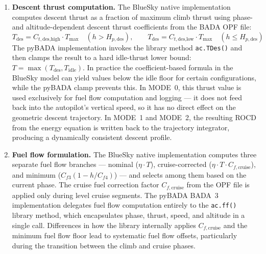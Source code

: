 \begin{enumerate}
    \item \textbf{Descent thrust computation.} The BlueSky native implementation computes descent thrust as a fraction of maximum climb thrust using phase- and altitude-dependent descent thrust coefficients from the BADA OPF file:
    \begin{equation}
        T_{\text{des}} = C_{t,\text{des,high}} \cdot T_{\max} \quad (h > H_{p,\text{des}}), \qquad
        T_{\text{des}} = C_{t,\text{des,low}} \cdot T_{\max} \quad (h \leq H_{p,\text{des}})
    \end{equation}
    The pyBADA implementation invokes the library method \texttt{ac.TDes()} and then clamps the result to a hard idle-thrust lower bound: $T = \max(T_{\text{des}}, T_{\text{idle}})$. In practice the coefficient-based formula in the BlueSky model can yield values below the idle floor for certain configurations, while the pyBADA clamp prevents this. In MODE~0, this thrust value is used exclusively for fuel flow computation and logging — it does not feed back into the autopilot's vertical speed, so it has no direct effect on the geometric descent trajectory. In MODE~1 and MODE~2, the resulting ROCD from the energy equation is written back to the trajectory integrator, producing a dynamically consistent descent profile.

    \item \textbf{Fuel flow formulation.} The BlueSky native implementation computes three separate fuel flow branches — nominal ($\eta \cdot T$), cruise-corrected ($\eta \cdot T \cdot C_{f,\text{cruise}}$), and minimum ($C_{f3}(1 - h/C_{f4})$) — and selects among them based on the current phase. The cruise fuel correction factor $C_{f,\text{cruise}}$ from the OPF file is applied only during level cruise segments. The pyBADA BADA~3 implementation delegates fuel flow computation entirely to the \texttt{ac.ff()} library method, which encapsulates phase, thrust, speed, and altitude in a single call. Differences in how the library internally applies $C_{f,\text{cruise}}$ and the minimum fuel flow floor lead to systematic fuel flow offsets, particularly during the transition between the climb and cruise phases.


\end{enumerate}
